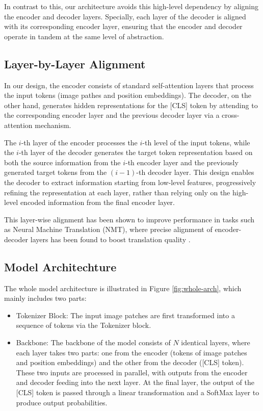 \documentclass[anon,12pt]{colt2024} %
\begin{document}
In contrast to this, our architecture avoids this high-level dependency by aligning the encoder and decoder layers.
Specially, each layer of the decoder is aligned with its corresponding encoder layer, ensuring that the encoder and decoder operate in tandem at the same level of abstraction.

\subsection{Layer-by-Layer Alignment}

In our design, the encoder consists of standard self-attention layers that process the input tokens (image pathes and position embeddings). The decoder, on the other hand, generates hidden representations for the [CLS] token by attending to the corresponding encoder layer and the previous decoder layer via a cross-attention mechanism.

The $i$-th layer of the encoder processes the $i$-th level of the input tokens, while the $i$-th layer of the decoder generates the target token representation based on both the source information from the $i$-th encoder layer and the previously generated target tokens from the $(i-1)$-th decoder layer. This design enables the decoder to extract information starting from low-level features, progressively refining the representation at each layer, rather than relying only on the high-level encoded information from the final encoder layer.

This layer-wise alignment has been shown to improve performance in tasks such as Neural Machine Translation (NMT), where precise alignment of encoder-decoder layers has been found to boost translation quality \cite{he2018layer}.

\subsection{Model Architechture} \label{subsection:model-arch}

The whole model architecture is illustrated in Figure \ref{fig:whole-arch}, which mainly includes two parts:
\begin{itemize}
  \item Tokenizer Block: The input image patches are first transformed into a sequence of tokens via the Tokenizer block.
  \item Backbone: The backbone of the model consists of $N$ identical layers, where each layer takes two parts: one from the encoder (tokens of image patches and position embeddings) and the other from the decoder ([CLS] token). These two inputs are processed in parallel, with outputs from the encoder and decoder feeding into the next layer. At the final layer, the output of the [CLS] token is passed through a linear transformation and a SoftMax layer to produce output probabilities.
\end{itemize}
\end{document}
